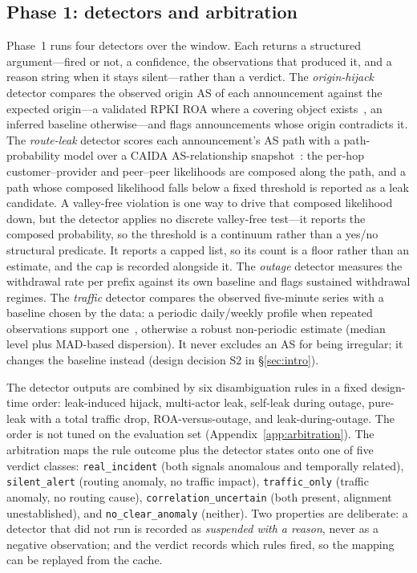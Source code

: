 \subsection{Phase 1: detectors and arbitration}
\label{sec:method-phase1}

Phase~1 runs four detectors over the window. Each returns a structured
argument---fired or not, a confidence, the observations that produced it,
and a reason string when it stays silent---rather than a verdict. The
\emph{origin-hijack} detector compares the observed origin AS of each
announcement against the expected origin---a validated RPKI ROA where a
covering object exists~\cite{rpki-validator}, an inferred baseline
otherwise---and flags announcements whose origin contradicts it. The
\emph{route-leak} detector scores each announcement's AS path with a
path-probability model over a CAIDA AS-relationship snapshot~\cite{caida-asrel}:
the per-hop customer--provider and peer--peer likelihoods are composed
along the path, and a path whose composed likelihood falls below a fixed
threshold is reported as a leak candidate. A valley-free violation is one
way to drive that composed likelihood down, but the detector applies no
discrete valley-free test---it reports the composed probability, so the
threshold is a continuum rather than a yes/no structural predicate. It
reports a capped list, so
its count is a floor rather than an estimate, and the cap is recorded
alongside it. The \emph{outage} detector measures the withdrawal rate per
prefix against its own baseline and flags sustained withdrawal regimes. The
\emph{traffic} detector compares the observed five-minute series with a
baseline chosen by the data: a periodic daily/weekly profile when repeated
observations support one~\cite{cleveland-stl}, otherwise a robust
non-periodic estimate (median level plus MAD-based dispersion). It never
excludes an AS for being irregular; it changes the baseline instead (design
decision S2 in \S\ref{sec:intro}).

The detector outputs are combined by six disambiguation rules in a fixed
design-time order: leak-induced hijack, multi-actor leak, self-leak during
outage, pure-leak with a total traffic drop, ROA-versus-outage, and
leak-during-outage. The order is not tuned on the evaluation set
(Appendix~\ref{app:arbitration}). The arbitration maps the rule outcome
plus the detector states onto one of five verdict classes:
\texttt{real\_incident} (both signals anomalous and temporally related),
\texttt{silent\_alert} (routing anomaly, no traffic impact),
\texttt{traffic\_only} (traffic anomaly, no routing cause),
\texttt{correlation\_uncertain} (both present, alignment unestablished), and
\texttt{no\_clear\_anomaly} (neither). Two properties are deliberate: a
detector that did not run is recorded as \emph{suspended with a reason},
never as a negative observation; and the verdict records which rules fired,
so the mapping can be replayed from the cache.

